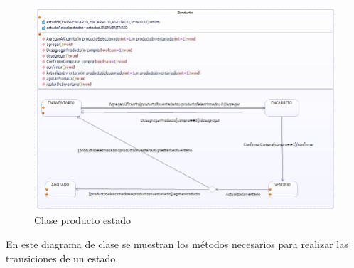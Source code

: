 \begin{figure}[th!]
	\centering
	\includegraphics[width=0.7\linewidth]{arquitectura/imagenes/clase_producto_estados}
	\caption{Clase producto estado}
\end{figure}

En este diagrama de clase se muestran los métodos necesarios para realizar las transiciones de un estado.







